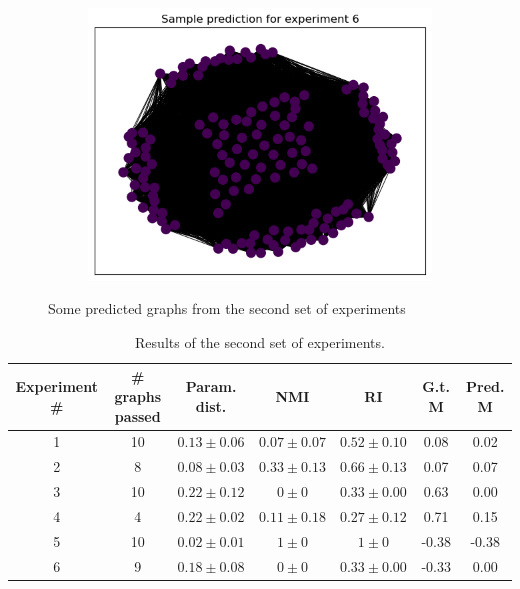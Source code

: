 \documentclass[switch, 12pt]{article}
\begin{document}
\begin{figure}[h]
\begin{subfigure}{0.28\linewidth}
        \includegraphics[width=\linewidth]{figures/exp6_pred.png}
    \end{subfigure}
    \hfill
    \caption{Some predicted graphs from the second set of experiments}
    \label{fig:pred_graphs}
\end{figure}

\begin{table}[ht]
    \centering
    \setlength\heavyrulewidth{0.25ex}
    \begin{tabular}{@{}ccccccc@{}}
        \toprule
        Experiment \# & \# graphs passed        & Param. dist.                         & NMI             & RI               & G.t. M & Pred. M \\ \midrule
        1             & \multicolumn{1}{c|}{10} & \multicolumn{1}{c|}{$0.13 \pm 0.06$} & $0.07 \pm 0.07$ & $0.52 \pm  0.10$ & 0.08   & 0.02    \\
        2             & \multicolumn{1}{c|}{8}  & \multicolumn{1}{c|}{$0.08 \pm 0.03$} & $0.33 \pm 0.13$ & $0.66 \pm 0.13$  & 0.07   & 0.07    \\
        3             & \multicolumn{1}{c|}{10} & \multicolumn{1}{c|}{$0.22 \pm 0.12$} & $0 \pm 0$       & $0.33 \pm 0.00$  & 0.63   & 0.00    \\
        4             & \multicolumn{1}{c|}{4}  & \multicolumn{1}{c|}{$0.22 \pm 0.02$} & $0.11 \pm 0.18$ & $0.27 \pm 0.12$  & 0.71   & 0.15    \\
        5             & \multicolumn{1}{c|}{10} & \multicolumn{1}{c|}{$0.02 \pm 0.01$} & $1 \pm 0$       & $1 \pm 0$        & -0.38  & -0.38   \\
        6             & \multicolumn{1}{c|}{9}  & \multicolumn{1}{c|}{$0.18 \pm 0.08$} & $0 \pm 0$       & $0.33 \pm 0.00$  & -0.33  & 0.00    \\ \bottomrule
    \end{tabular}
    \caption{Results of the second set of experiments.}
    \label{tab:sbm_results}
\end{table}
\end{document}
